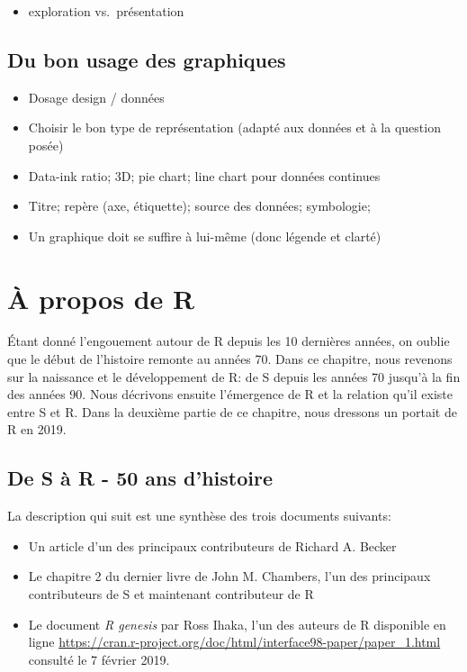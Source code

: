 \documentclass[]{article}
\providecommand{\tightlist}{%
  \setlength{\itemsep}{0pt}\setlength{\parskip}{0pt}}
\begin{document}
\begin{itemize}
\tightlist
\item
  exploration vs.~présentation
\end{itemize}

\hypertarget{du-bon-usage-des-graphiques}{%
\subsection{Du bon usage des graphiques}\label{du-bon-usage-des-graphiques}}

\begin{itemize}
\tightlist
\item
  Dosage design / données
\item
  Choisir le bon type de représentation (adapté aux données et à la question posée)
\item
  Data-ink ratio; 3D; pie chart; line chart pour données continues
\item
  Titre; repère (axe, étiquette); source des données; symbologie;
\item
  Un graphique doit se suffire à lui-même (donc légende et clarté)
\end{itemize}

\hypertarget{uxe0-propos-de-r}{%
\section{À propos de R}\label{uxe0-propos-de-r}}

Étant donné l'engouement autour de R depuis les 10 dernières années, on oublie
que le début de l'histoire remonte au années 70. Dans ce chapitre, nous revenons
sur la naissance et le développement de R: de S depuis les années 70 jusqu'à la
fin des années 90. Nous décrivons ensuite l'émergence de R et la relation qu'il
existe entre S et R. Dans la deuxième partie de ce chapitre, nous dressons un
portait de R en 2019.

\hypertarget{de-s-uxe0-r---50-ans-dhistoire}{%
\subsection{De S à R - 50 ans d'histoire}\label{de-s-uxe0-r---50-ans-dhistoire}}

La description qui suit est une synthèse des trois documents suivants:

\begin{itemize}
\tightlist
\item
  Un article d'un des principaux contributeurs de Richard A. Becker \citep{becker_brief_1994}
\item
  Le chapitre 2 du dernier livre de John M. Chambers, l'un des
  principaux contributeurs de S et maintenant contributeur de R \citep{chambers_extending_2016}
\item
  Le document \emph{R genesis} par Ross Ihaka, l'un des auteurs de R disponible en ligne \url{https://cran.r-project.org/doc/html/interface98-paper/paper_1.html} consulté le 7 février 2019.
\end{itemize}
\end{document}
